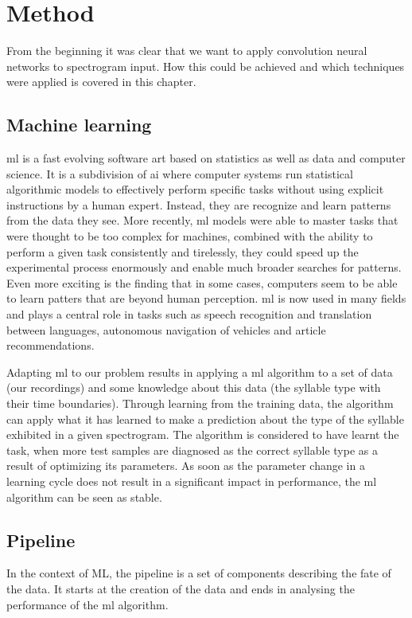 \chapter{Method}
\label{ch:method}
From the beginning it was clear that we want to apply convolution neural networks to spectrogram input. How this could be achieved and which techniques were applied is covered in this chapter.

\section{Machine learning}
\Gls{ml} is a fast evolving software art based on statistics as well as data and computer science. It is a subdivision of \gls{ai} where computer systems run statistical algorithmic models to effectively perform specific tasks without using explicit instructions by a human expert. Instead, they are recognize and learn patterns from the data they see.
More recently, \gls{ml} models were able to master tasks that were thought to be too complex for machines, combined with the ability to perform a given task consistently and tirelessly, they could speed up the experimental process enormously and enable much broader searches for patterns. Even more exciting is the finding that in some cases, computers seem to be able to learn patters that are beyond human perception.
\Gls{ml} is now used in many fields and plays a central role in tasks such as speech recognition and translation between languages, autonomous navigation of vehicles and article recommendations.

Adapting \gls{ml} to our problem results in applying a \gls{ml} algorithm to a set of data (our recordings) and some knowledge about this data (the syllable type with their time boundaries). Through learning from the training data, the algorithm can apply what it has learned to make a prediction about the type of the syllable exhibited in a given spectrogram. The algorithm is considered to have learnt the task, when more test samples are diagnosed as the correct syllable type as a result of optimizing its parameters.
As soon as the parameter change in a learning cycle does not result in a significant impact in performance, the \gls{ml} algorithm can be seen as stable.

\section{Pipeline}
In the context of ML, the pipeline is a set of components describing the fate of the data.
It starts at the creation of the data and ends in analysing the performance of the \gls{ml} algorithm.


